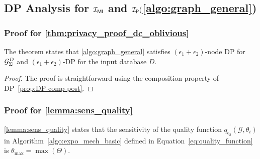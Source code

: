 \subsection{DP Analysis for  $\mathcal{I_{\mathsf{MI}}}$ and $\mathcal{I_\mathsf{P}} ($\cref{algo:graph_general})}\label{app:graph_general}
\subsubsection{Proof for \cref{thm:privacy_proof_dc_oblivious}}\label{app:privacy_proof_dc_oblivious}
The theorem states that \cref{algo:graph_general} satisfies $(\epsilon_1 + \epsilon_2)$-node DP for ${\mathcal{G}_{{\Sigma}}^{D}}$ and $(\epsilon_1 + \epsilon_2)$-DP for the input database $D$.
\begin{proof}
The proof is straightforward using the composition property of DP~\cref{prop:DP-comp-post}.
\end{proof}

\subsubsection{Proof for \cref{lemma:sens_quality}}\label{app:sens_quality}
\cref{lemma:sens_quality} states that the sensitivity of the quality function $q_{\epsilon_2}(\mathcal{G}, \theta_i)$ in Algorithm~\ref{algo:expo_mech_basic} defined in Equation~\eqref{eq:quality_function} is $\theta_{\max}=\max(\Theta)$. 

